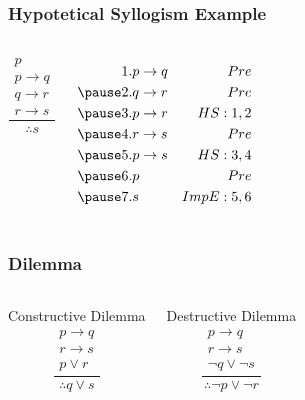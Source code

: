 \documentclass[dvipsnames]{beamer}
\begin{document}
\begin{frame}
  \frametitle{Hypotetical Syllogism Example}

  \begin{example}
    \begin{columns}
      \[
      \frac
        {
          \begin{array}{c}
            p\\
            p \rightarrow q\\
            q \rightarrow r\\
            r \rightarrow s
          \end{array}
        }
        {
          \therefore s
        }
      \]

      \pause
      \begin{eqnarray*}
        1. & p \rightarrow q & Pre\\
        \pause
        2. & q \rightarrow r & Pre\\
        \pause
        3. & p \rightarrow r & HS:1,2\\
        \pause
        4. & r \rightarrow s & Pre\\
        \pause
        5. & p \rightarrow s & HS:3,4\\
        \pause
        6. & p               & Pre\\
        \pause
        7. & s               & ImpE:5,6
      \end{eqnarray*}
    \end{columns}
  \end{example}
\end{frame}

\begin{frame}
  \frametitle{Dilemma}

  \begin{columns}[t]
    \begin{block}{Constructive Dilemma}
      \[
      \frac
        {
          \begin{array}{c}
            p \rightarrow q\\
            r \rightarrow s\\
            p \vee r
          \end{array}}
        {
          \therefore q \vee s
        }
      \]
    \end{block}

    \pause
    \begin{block}{Destructive Dilemma}
      \[
      \frac
        {
          \begin{array}{c}
            p \rightarrow q\\
            r \rightarrow s\\
            \neg q \vee \neg s
          \end{array}
          }
          {
            \therefore \neg p \vee \neg r
          }
      \]
    \end{block}
  \end{columns}
\end{frame}
\end{document}
